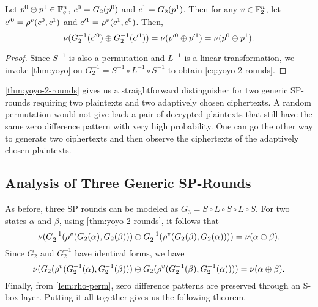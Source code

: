 \documentclass[twoside]{article}
\begin{document}
\begin{theorem}
    \label{thm:yoyo-2-rounds}
    Let \(p^0 \oplus p^1 \in \mathbb F_q^n\), \(c^0 = G_2(p^0)\) and \(c^1 =
    G_2(p^1)\). Then for any \(v \in \mathbb F_2^n\), let \(c^{\prime 0} =
    \rho^v(c^0, c^1)\) and \(c^{\prime 1} = \rho^v(c^1, c^0)\). Then,
    \begin{equation}
        \nu(G_2^{-1}(c^{\prime 0}) \oplus G_2^{-1}(c^{\prime 1})) = \nu(p^{\prime 0} \oplus p^{\prime 1}) = \nu(p^0 \oplus p^1).
        \label{eq:yoyo-2-rounds}
    \end{equation}
\end{theorem}
\begin{proof}
    Since \(S^{-1}\) is also a permutation and \(L^{-1}\) is a linear
    transformation, we invoke \autoref{thm:yoyo} on \(G_2^{-1} = S^{-1} \circ
    L^{-1} \circ S^{-1}\) to obtain \eqref{eq:yoyo-2-rounds}.
\end{proof}

\autoref{thm:yoyo-2-rounds} gives us a straightforward distinguisher for two
generic SP-rounds requiring two plaintexts and two adaptively chosen
ciphertexts. A random permutation would not give back a pair of decrypted
plaintexts that still have the same zero difference pattern with very high
probability. One can go the other way to generate two ciphertexts and then
observe the ciphertexts of the adaptively chosen plaintexts.

\subsection{Analysis of Three Generic SP-Rounds}

As before, three SP rounds can be modeled as \(G_3 = S \circ L \circ S \circ L
\circ S\). For two states \(\alpha\) and \(\beta\), using
\autoref{thm:yoyo-2-rounds}, it follows that
\begin{equation}
    \nu(G_2^{-1}(\rho^v(G_2(\alpha), G_2(\beta))) \oplus G_2^{-1}(\rho^v(G_2(\beta), G_2(\alpha)))) = \nu(\alpha \oplus \beta).
\end{equation}
Since \(G_2\) and \(G_2^{-1}\) have identical forms, we have
\begin{equation}
    \nu(G_2(\rho^v(G_2^{-1}(\alpha), G_2^{-1}(\beta))) \oplus G_2(\rho^v(G_2^{-1}(\beta), G_2^{-1}(\alpha)))) = \nu(\alpha \oplus \beta).
\end{equation}
Finally, from \autoref{lem:rho-perm}, zero difference patterns are preserved
through an S-box layer. Putting it all together gives us the following theorem.
\end{document}
